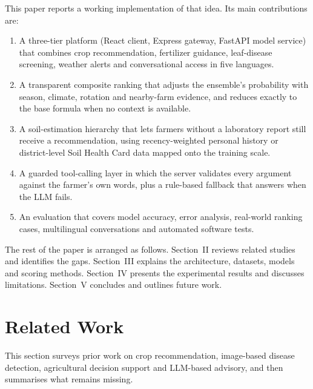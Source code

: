 \documentclass[conference]{IEEEtran}
\begin{document}
This paper reports a working implementation of that idea. Its main contributions are:
\begin{enumerate}
\item A three-tier platform (React client, Express gateway, FastAPI model service) that combines crop recommendation, fertilizer guidance, leaf-disease screening, weather alerts and conversational access in five languages.
\item A transparent composite ranking that adjusts the ensemble's probability with season, climate, rotation and nearby-farm evidence, and reduces exactly to the base formula when no context is available.
\item A soil-estimation hierarchy that lets farmers without a laboratory report still receive a recommendation, using recency-weighted personal history or district-level Soil Health Card data mapped onto the training scale.
\item A guarded tool-calling layer in which the server validates every argument against the farmer's own words, plus a rule-based fallback that answers when the LLM fails.
\item An evaluation that covers model accuracy, error analysis, real-world ranking cases, multilingual conversations and automated software tests.
\end{enumerate}

The rest of the paper is arranged as follows. Section~II reviews related studies and identifies the gaps. Section~III explains the architecture, datasets, models and scoring methods. Section~IV presents the experimental results and discusses limitations. Section~V concludes and outlines future work.

\section{Related Work}

This section surveys prior work on crop recommendation, image-based disease detection, agricultural decision support and LLM-based advisory, and then summarises what remains missing.
\end{document}

